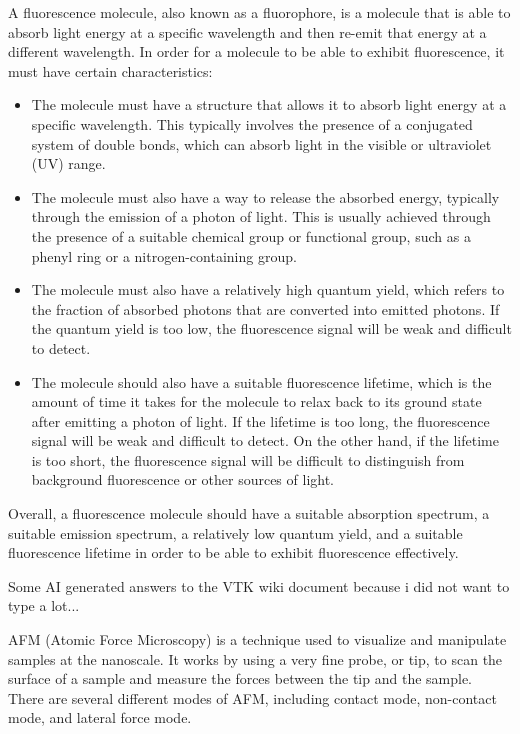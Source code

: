 \documentclass{article}
\begin{document}
A fluorescence molecule, also known as a fluorophore, is a molecule that is able to absorb light energy at a specific wavelength and then re-emit that energy at a different wavelength. In order for a molecule to be able to exhibit fluorescence, it must have certain characteristics:
\begin{itemize}


\item The molecule must have a structure that allows it to absorb light energy at a specific wavelength. This typically involves the presence of a conjugated system of double bonds, which can absorb light in the visible or ultraviolet (UV) range.

\item The molecule must also have a way to release the absorbed energy, typically through the emission of a photon of light. This is usually achieved through the presence of a suitable chemical group or functional group, such as a phenyl ring or a nitrogen-containing group.

\item The molecule must also have a relatively high quantum yield, which refers to the fraction of absorbed photons that are converted into emitted photons. If the quantum yield is too low, the fluorescence signal will be weak and difficult to detect.

\item The molecule should also have a suitable fluorescence lifetime, which is the amount of time it takes for the molecule to relax back to its ground state after emitting a photon of light. If the lifetime is too long, the fluorescence signal will be weak and difficult to detect. On the other hand, if the lifetime is too short, the fluorescence signal will be difficult to distinguish from background fluorescence or other sources of light.
\end{itemize}

Overall, a fluorescence molecule should have a suitable absorption spectrum, a suitable emission spectrum, a relatively low quantum yield, and a suitable fluorescence lifetime in order to be able to exhibit fluorescence effectively.

Some AI generated answers to the VTK wiki document because i did not want to type a lot...

AFM (Atomic Force Microscopy) is a technique used to visualize and manipulate samples at the nanoscale. It works by using a very fine probe, or tip, to scan the surface of a sample and measure the forces between the tip and the sample. There are several different modes of AFM, including contact mode, non-contact mode, and lateral force mode.\\
\end{document}
